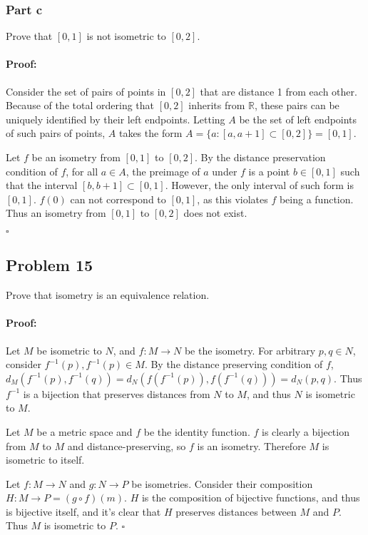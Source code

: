 \documentclass{article}
\newenvironment{proof}{\paragraph{Proof:}}{\hfill$\square$}
\begin{document}
\subsubsection*{Part c}

Prove that $[0, 1]$ is not isometric to $[0, 2]$.

\begin{proof}

Consider the set of pairs of points in $[0, 2]$ that are distance 1 from each other. Because of the total ordering that $[0, 2]$ inherits from $\mathbb{R}$, these pairs can be uniquely identified by their left endpoints. Letting $A$ be the set of left endpoints of such pairs of points, $A$ takes the form $A = \{a: [a, a+1] \subset [0, 2]\} = [0, 1]$.

Let $f$ be an isometry from $[0, 1]$ to $[0, 2]$. By the distance preservation condition of $f$, for all $a \in A$, the preimage of $a$ under $f$ is a point $b \in [0, 1]$ such that the interval $[b, b+1] \subset [0, 1]$. However, the only interval of such form is $[0, 1]$. $f(0)$ can not correspond to $[0, 1]$, as this violates $f$ being a function. Thus an isometry from $[0, 1]$ to $[0, 2]$ does not exist.

\end{proof}

\subsection*{Problem 15}

Prove that isometry is an equivalence relation.

\begin{proof}
Let $M$ be isometric to $N$, and $f: M\rightarrow N$ be the isometry. For arbitrary $p, q \in N$, consider $f^{-1}(p), f^{-1}(p) \in M$. By the distance preserving condition of $f$, $d_M(f^{-1}(p), f^{-1}(q)) = d_N(f(f^{-1}(p)), f(f^{-1}(q))) = d_N(p, q)$. Thus $f^{-1}$ is a bijection that preserves distances from $N$ to $M$, and thus $N$ is isometric to $M$.

Let $M$ be a metric space and $f$ be the identity function. $f$ is clearly a bijection from $M$ to $M$ and distance-preserving, so $f$ is an isometry. Therefore $M$ is isometric to itself.

Let $f:M \rightarrow N$ and $g:N \rightarrow P$ be isometries. Consider their composition $H:M \rightarrow P = (g \circ f)(m)$. $H$ is the composition of bijective functions, and thus is bijective itself, and it's clear that $H$ preserves distances between $M$ and $P$. Thus $M$ is isometric to $P$.
\end{proof}
\end{document}
